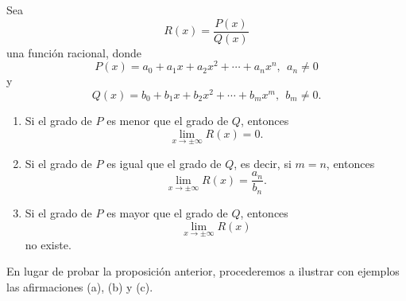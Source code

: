 \documentclass[12pt,a4paper]{book}
\begin{document}
    \begin{proposicion}\label{prop:45}
        Sea
        \begin{equation*}
            R(x)=\frac{P(x)}{Q(x)}
        \end{equation*}
        una función racional, donde
        \begin{equation*}
            P(x)=a_{0}+a_{1}x+a_{2}x^{2}+\cdots+a_{n}x^{n},\ \ a_{n}\neq 0
        \end{equation*}
        y
        \begin{equation*}
            Q(x)=b_{0}+b_{1}x+b_{2}x^{2}+\cdots+b_{m}x^{m},\ \ b_{m}\neq 0.
        \end{equation*}
        \begin{enumerate}
            \item Si el grado de $P$ es menor que el grado de $Q$, entonces
            \begin{equation*}
                \lim_{x\to\pm\infty}R(x)=0.
            \end{equation*}
            \item Si el grado de $P$ es igual que el grado de $Q$, es decir, si $m=n$, entonces
            \begin{equation*}
                \lim_{x\to\pm\infty}R(x)=\frac{a_{n}}{b_{n}}.
            \end{equation*}
            \item Si el grado de $P$ es mayor que el grado de $Q$, entonces
            \begin{equation*}
                \lim_{x\to\pm\infty}R(x)
            \end{equation*}
            no existe.
        \end{enumerate}
    \end{proposicion}

    En lugar de probar la proposición anterior, procederemos a ilustrar con
    ejemplos las afirmaciones (a), (b) y (c).
\end{document}
